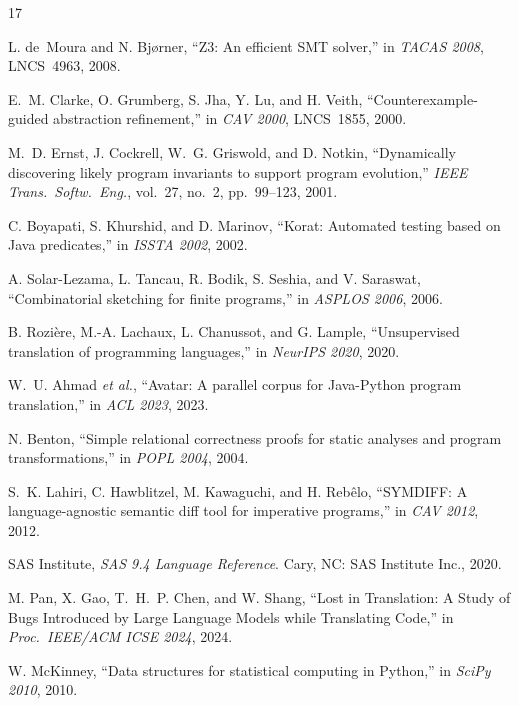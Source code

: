 \documentclass[conference]{IEEEtran}
\begin{document}

\begin{thebibliography}{17}

L. de~Moura and N. Bjørner,
``Z3: An efficient SMT solver,''
in \emph{TACAS 2008}, LNCS~4963, 2008.

E.~M. Clarke, O. Grumberg, S. Jha, Y. Lu, and H. Veith,
``Counterexample-guided abstraction refinement,''
in \emph{CAV 2000}, LNCS~1855, 2000.

M.~D. Ernst, J. Cockrell, W.~G. Griswold, and D. Notkin,
``Dynamically discovering likely program invariants to support program evolution,''
\emph{IEEE Trans.\ Softw.\ Eng.}, vol.~27, no.~2, pp.~99--123, 2001.

C. Boyapati, S. Khurshid, and D. Marinov,
``Korat: Automated testing based on Java predicates,''
in \emph{ISSTA 2002}, 2002.

A. Solar-Lezama, L. Tancau, R. Bodik, S. Seshia, and V. Saraswat,
``Combinatorial sketching for finite programs,''
in \emph{ASPLOS 2006}, 2006.

B. Rozi\`{e}re, M.-A. Lachaux, L. Chanussot, and G. Lample,
``Unsupervised translation of programming languages,''
in \emph{NeurIPS 2020}, 2020.

W.~U. Ahmad \emph{et al.},
``Avatar: A parallel corpus for Java-Python program translation,''
in \emph{ACL 2023}, 2023.

N. Benton,
``Simple relational correctness proofs for static analyses and program transformations,''
in \emph{POPL 2004}, 2004.

S.~K. Lahiri, C. Hawblitzel, M. Kawaguchi, and H. Reb\^{e}lo,
``SYMDIFF: A language-agnostic semantic diff tool for imperative programs,''
in \emph{CAV 2012}, 2012.

SAS Institute,
\emph{SAS 9.4 Language Reference}.
Cary, NC: SAS Institute Inc., 2020.

M. Pan, X. Gao, T.~H.~P. Chen, and W. Shang,
``Lost in Translation: A Study of Bugs Introduced by Large Language Models
  while Translating Code,''
in \emph{Proc.\ IEEE/ACM ICSE 2024}, 2024.

W. McKinney,
``Data structures for statistical computing in Python,''
in \emph{SciPy 2010}, 2010.


\end{thebibliography}
\end{document}
